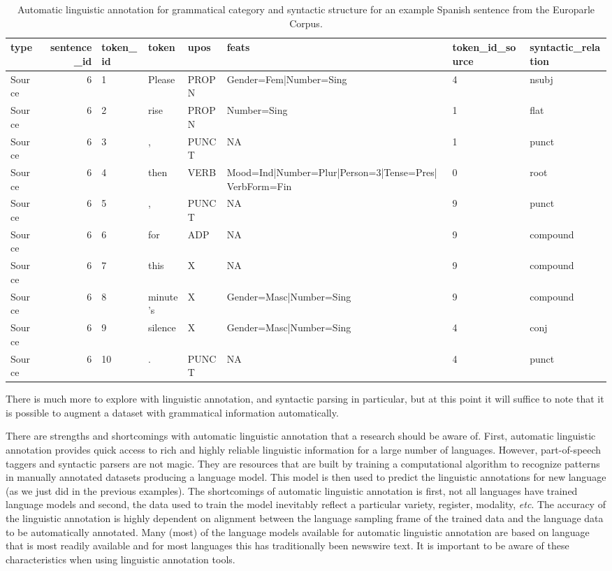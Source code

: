 \documentclass[
  letterpaper,
]{scrbook}
\begin{document}
\hypertarget{tbl-generation-europarle-es-example}{}
\begin{table}
\caption{\label{tbl-generation-europarle-es-example}Automatic linguistic annotation for grammatical category and syntactic
structure for an example Spanish sentence from the Europarle Corpus. }\tabularnewline

\centering
\begin{tabular}{lrllllll}
\toprule
type & sentence\_id & token\_id & token & upos & feats & token\_id\_source & syntactic\_relation\\
\midrule
Source & 6 & 1 & Please & PROPN & Gender=Fem|Number=Sing & 4 & nsubj\\
Source & 6 & 2 & rise & PROPN & Number=Sing & 1 & flat\\
Source & 6 & 3 & , & PUNCT & NA & 1 & punct\\
Source & 6 & 4 & then & VERB & Mood=Ind|Number=Plur|Person=3|Tense=Pres|VerbForm=Fin & 0 & root\\
Source & 6 & 5 & , & PUNCT & NA & 9 & punct\\
\addlinespace
Source & 6 & 6 & for & ADP & NA & 9 & compound\\
Source & 6 & 7 & this & X & NA & 9 & compound\\
Source & 6 & 8 & minute's & X & Gender=Masc|Number=Sing & 9 & compound\\
Source & 6 & 9 & silence & X & Gender=Masc|Number=Sing & 4 & conj\\
Source & 6 & 10 & . & PUNCT & NA & 4 & punct\\
\bottomrule
\end{tabular}
\end{table}

There is much more to explore with linguistic annotation, and syntactic
parsing in particular, but at this point it will suffice to note that it
is possible to augment a dataset with grammatical information
automatically.

There are strengths and shortcomings with automatic linguistic
annotation that a research should be aware of. First, automatic
linguistic annotation provides quick access to rich and highly reliable
linguistic information for a large number of languages. However,
part-of-speech taggers and syntactic parsers are not magic. They are
resources that are built by training a computational algorithm to
recognize patterns in manually annotated datasets producing a language
model. This model is then used to predict the linguistic annotations for
new language (as we just did in the previous examples). The shortcomings
of automatic linguistic annotation is first, not all languages have
trained language models and second, the data used to train the model
inevitably reflect a particular variety, register, modality, \emph{etc}.
The accuracy of the linguistic annotation is highly dependent on
alignment between the language sampling frame of the trained data and
the language data to be automatically annotated. Many (most) of the
language models available for automatic linguistic annotation are based
on language that is most readily available and for most languages this
has traditionally been newswire text. It is important to be aware of
these characteristics when using linguistic annotation tools.
\end{document}

